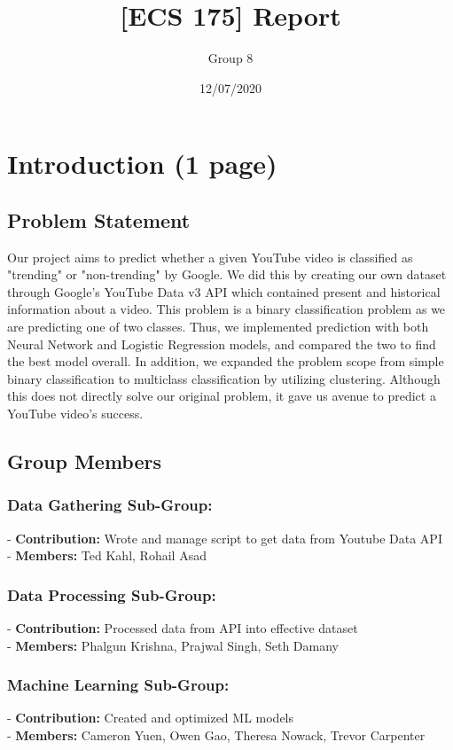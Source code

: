 \documentclass{article}
\title{[ECS 175] Report}
\date{12/07/2020}
\author{Group 8}
\begin{document}
\maketitle

\section*{Introduction (1 page)}
\subsection*{Problem Statement}
Our project aims to predict whether a given YouTube video is classified as "trending" or "non-trending" by Google. We did this by creating our own dataset through Google's YouTube Data v3 API which contained present and historical information about a video. This problem is a binary classification problem as we are predicting one of two classes. Thus, we implemented prediction with both Neural Network and Logistic Regression models, and compared the two to find the best model overall. In addition, we expanded the problem scope from simple binary classification to multiclass classification by utilizing clustering. Although this does not directly solve our original problem, it gave us avenue to predict a YouTube video's success.

\subsection*{Group Members}
\subsubsection*{Data Gathering Sub-Group:}
- \textbf{Contribution:} Wrote and manage script to get data from Youtube Data API \\
- \textbf{Members:} Ted Kahl, Rohail Asad
\subsubsection*{Data Processing Sub-Group:}
- \textbf{Contribution:} Processed data from API into effective dataset \\
- \textbf{Members:} Phalgun Krishna, Prajwal Singh, Seth Damany
\subsubsection*{Machine Learning Sub-Group:}
- \textbf{Contribution:} Created and optimized ML models \\
- \textbf{Members:} Cameron Yuen, Owen Gao, Theresa Nowack, Trevor Carpenter
\end{document}
